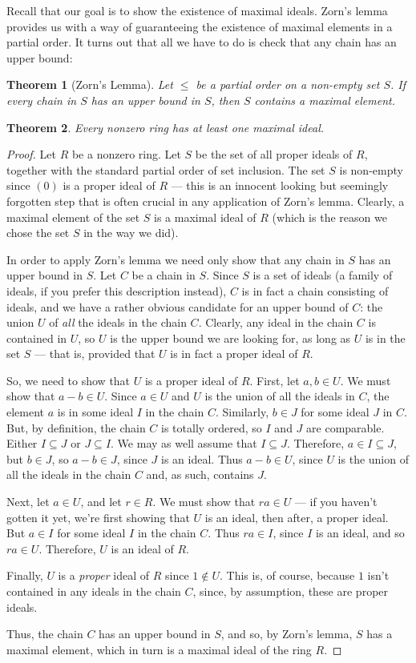\documentclass[12pt,reqno]{amsart}
\theoremstyle{plain}
\newtheorem{theorem}{Theorem}
\begin{document}
Recall that our goal is to show the existence of maximal ideals. Zorn's lemma provides us with a way of guaranteeing the existence of maximal elements in a partial order. It turns out that all we have to do is check that any chain has an upper bound: 
\begin{theorem}[Zorn's Lemma] Let $\leq$ be a partial order on a non-empty set $S$. If every chain in $S$ has an upper bound in $S$, then $S$ contains a maximal element.
\end{theorem}
\begin{theorem} Every nonzero ring has at least one maximal ideal.
\end{theorem}
\begin{proof} Let $R$ be a nonzero ring. Let $S$ be the set of all proper ideals of $R$, together with the standard partial order of set inclusion. The set $S$ is non-empty since $(0)$ is a proper ideal of $R$ — this is an innocent looking but seemingly forgotten step that is often crucial in any application of Zorn's lemma. Clearly, a maximal element of the set $S$ is a maximal ideal of $R$ (which is the reason we chose the set $S$ in the way we did). 

In order to apply Zorn's lemma we need only show that any chain in $S$ has an upper bound in $S$. Let $C$ be a chain in $S$. Since $S$ is a set of ideals (a family of ideals, if you prefer this description instead), $C$ is in fact a chain consisting of ideals, and we have a rather obvious candidate for an upper bound of $C$: the union $U$ of \textit{all} the ideals in the chain $C$. Clearly, any ideal in the chain $C$ is contained in $U$, so $U$ is the upper bound we are looking for, as long as $U$ is in the set $S$ — that is, provided that $U$ is in fact a proper ideal of $R$. 

So, we need to show that $U$ is a proper ideal of $R$. First, let $a, b \in U$. We must show that $a-b \in U$. Since $a \in U$ and $U$ is the union of all the ideals in $C$, the element $a$ is in some ideal $I$ in the chain $C$. Similarly, $b \in J$ for some ideal $J$ in $C$. But, by definition, the chain $C$ is totally ordered, so $I$ and $J$ are comparable. Either $I \subseteq J$ or $J \subseteq I$. We may as well assume that $I \subseteq J$. Therefore, $a \in I \subseteq J$, but $b \in J$, so $a-b \in J$, since $J$ is an ideal. Thus $a-b \in U$, since $U$ is the union of all the ideals in the chain $C$ and, as such, contains $J$.

Next, let $a \in U$, and let $r \in R$. We must show that $ra \in U$ — if you haven't gotten it yet, we're first showing that $U$ is an ideal, then after, a proper ideal. But $a \in I$ for some ideal $I$ in the chain $C$. Thus $ra \in I$, since $I$ is an ideal, and so $ ra \in U$. Therefore, $U$ is an ideal of $R$.

Finally, $U$ is a \textit{proper} ideal of $R$ since $1 \notin U$. This is, of course, because $1$ isn't contained in any ideals in the chain $C$, since, by assumption, these are proper ideals. 

Thus, the chain $C$ has an upper bound in $S$, and so, by Zorn's lemma, $S$ has a maximal element, which in turn is a maximal ideal of the ring $R$. 
\end{proof}
\end{document}
